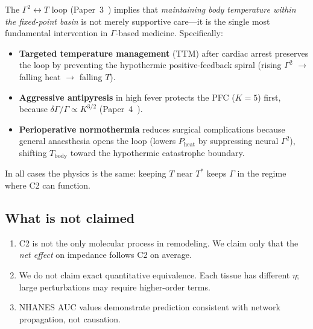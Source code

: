 \documentclass[aps,pre,twocolumn,superscriptaddress,floatfix]{revtex4-2}
\begin{document}
The $\Gamma^2\!\leftrightarrow\!T$ loop
(Paper~3~\cite{Paper3}) implies that \emph{maintaining
body temperature within the fixed-point basin} is not
merely supportive care---it is the single most
fundamental intervention in $\Gamma$-based medicine.
Specifically:
\begin{itemize}
  \item \textbf{Targeted temperature management} (TTM)
    after cardiac arrest preserves the loop by preventing
    the hypothermic positive-feedback spiral
    (rising $\Gamma^2$ $\to$ falling heat $\to$ falling $T$).
  \item \textbf{Aggressive antipyresis} in high fever
    protects the PFC ($K{=}5$) first, because
    $\delta\Gamma/\Gamma \propto K^{3/2}$
    (Paper~4~\cite{Paper4}).
  \item \textbf{Perioperative normothermia} reduces
    surgical complications because general anaesthesia
    opens the loop (lowers $P_{\mathrm{heat}}$ by
    suppressing neural $\Gamma^2$), shifting
    $T_{\mathrm{body}}$ toward the hypothermic
    catastrophe boundary.
\end{itemize}
In all cases the physics is the same: keeping $T$
near $T^*$ keeps $\Gamma$ in the regime where C2 can
function.

\subsection{What is not claimed}

\begin{enumerate}
  \item C2 is not the only molecular process in remodeling.
    We claim only that the \emph{net effect} on impedance
    follows C2 on average.
  \item We do not claim exact quantitative equivalence.
    Each tissue has different $\eta$; large perturbations
    may require higher-order terms.
  \item NHANES AUC values demonstrate prediction consistent
    with network propagation, not causation.
\end{enumerate}
\end{document}
